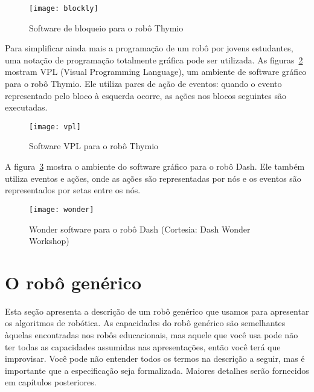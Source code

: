 \begin{figure}
\begin{center}
\texttt{[image: blockly]}
\end{center}
\caption{Software de bloqueio para o robô Thymio}\label{fig.ide-blocks}
\end{figure}

Para simplificar ainda mais a programação de um robô por jovens estudantes, uma notação de programação totalmente gráfica pode ser utilizada. As figuras~\ref{fig.ide-thymio} mostram VPL (Visual Programming Language), um ambiente de software gráfico para o robô Thymio. Ele utiliza pares de ação de eventos: quando o evento representado pelo bloco à esquerda ocorre, as ações nos blocos seguintes são executadas.

\begin{figure}
\begin{center}
\texttt{[image: vpl]}
\end{center}
\caption{Software VPL para o robô Thymio}\label{fig.ide-thymio}
\end{figure}

A figura~\ref{fig.ide-dash} mostra o ambiente do software gráfico para o robô Dash. Ele também utiliza eventos e ações, onde as ações são representadas por nós e os eventos são representados por setas entre os nós.

\begin{figure}
\begin{center}
\texttt{[image: wonder]}
\end{center}
\caption{Wonder software para o robô Dash (Cortesia: Dash Wonder Workshop)}\label{fig.ide-dash}
\end{figure}

\section{O robô genérico}\label{s.generic}

Esta seção apresenta a descrição de um robô genérico que usamos para apresentar os algoritmos de robótica. As capacidades do robô genérico são semelhantes àquelas encontradas nos robôs educacionais, mas aquele que você usa pode não ter todas as capacidades assumidas nas apresentações, então você terá que improvisar. Você pode não entender todos os termos na descrição a seguir, mas é importante que a especificação seja formalizada. Maiores detalhes serão fornecidos em capítulos posteriores.


